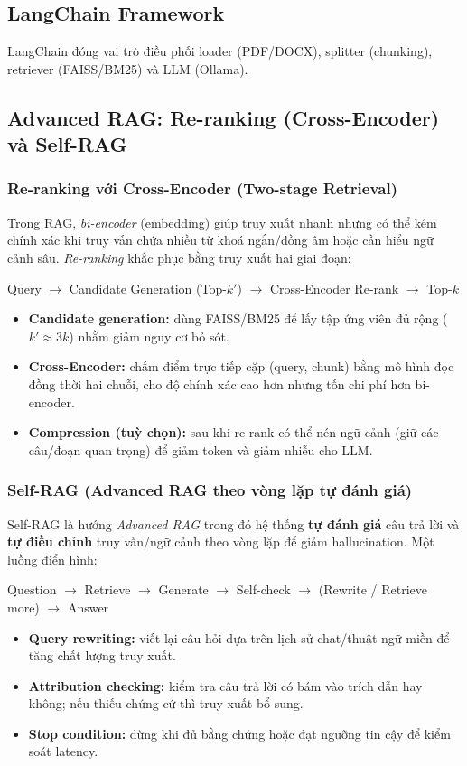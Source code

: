 \documentclass[10pt, conference, a4paper, compsocconf]{IEEEtran}
\begin{document}
\subsection{LangChain Framework}

LangChain đóng vai trò điều phối loader (PDF/DOCX), splitter (chunking), retriever (FAISS/BM25) và LLM (Ollama).

\subsection{Advanced RAG: Re-ranking (Cross-Encoder) và Self-RAG}
\subsubsection{Re-ranking với Cross-Encoder (Two-stage Retrieval)}
Trong RAG, \textit{bi-encoder} (embedding) giúp truy xuất nhanh nhưng có thể kém chính xác khi truy vấn chứa nhiều từ khoá ngắn/đồng âm hoặc cần hiểu ngữ cảnh sâu. \textit{Re-ranking} khắc phục bằng truy xuất hai giai đoạn:
\begin{center}
  \footnotesize
  Query \(\rightarrow\) Candidate Generation (Top-\(k'\)) \(\rightarrow\) Cross-Encoder Re-rank \(\rightarrow\) Top-\(k\)
\end{center}
\begin{itemize}
  \item \textbf{Candidate generation:} dùng FAISS/BM25 để lấy tập ứng viên đủ rộng (\(k' \approx 3k\)) nhằm giảm nguy cơ bỏ sót.
  \item \textbf{Cross-Encoder:} chấm điểm trực tiếp cặp (query, chunk) bằng mô hình đọc đồng thời hai chuỗi, cho độ chính xác cao hơn nhưng tốn chi phí hơn bi-encoder.
  \item \textbf{Compression (tuỳ chọn):} sau khi re-rank có thể nén ngữ cảnh (giữ các câu/đoạn quan trọng) để giảm token và giảm nhiễu cho LLM.
\end{itemize}

\subsubsection{Self-RAG (Advanced RAG theo vòng lặp tự đánh giá)}
Self-RAG là hướng \textit{Advanced RAG} trong đó hệ thống \textbf{tự đánh giá} câu trả lời và \textbf{tự điều chỉnh} truy vấn/ngữ cảnh theo vòng lặp để giảm hallucination. Một luồng điển hình:
\begin{center}
  \footnotesize
  Question \(\rightarrow\) Retrieve \(\rightarrow\) Generate \(\rightarrow\) Self-check \(\rightarrow\) (Rewrite / Retrieve more) \(\rightarrow\) Answer
\end{center}
\begin{itemize}
  \item \textbf{Query rewriting:} viết lại câu hỏi dựa trên lịch sử chat/thuật ngữ miền để tăng chất lượng truy xuất.
  \item \textbf{Attribution checking:} kiểm tra câu trả lời có bám vào trích dẫn hay không; nếu thiếu chứng cứ thì truy xuất bổ sung.
  \item \textbf{Stop condition:} dừng khi đủ bằng chứng hoặc đạt ngưỡng tin cậy để kiểm soát latency.
\end{itemize}
\end{document}

